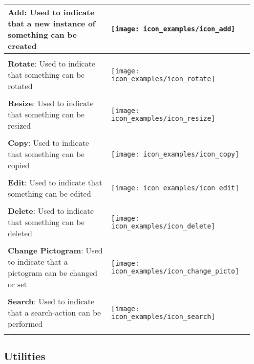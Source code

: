 \begin{longtable}{m{\textwidth-2.2cm} m{1.5cm}}
	\textbf{Add}: Used to indicate that a new instance of something can be created & \parbox[c]{1.2cm}{
	\texttt{[image: icon\_examples/icon\_add]}} \\[0.6cm] \hline \\[-0.6em]

	\textbf{Rotate}: Used to indicate that something can be rotated & \parbox[c]{1.2cm}{
	\texttt{[image: icon\_examples/icon\_rotate]}} \\[0.6cm] \hline \\[-0.6em]

	\textbf{Resize}: Used to indicate that something can be resized & \parbox[c]{1.2cm}{
	\texttt{[image: icon\_examples/icon\_resize]}} \\[0.6cm] \hline \\[-0.6em]

	\textbf{Copy}: Used to indicate that something can be copied & \parbox[c]{1.2cm}{
	\texttt{[image: icon\_examples/icon\_copy]}} \\[0.6cm] \hline \\[-0.6em]

	\textbf{Edit}: Used to indicate that something can be edited & \parbox[c]{1.2cm}{
	\texttt{[image: icon\_examples/icon\_edit]}} \\[0.6cm] \hline \\[-0.6em]

	\textbf{Delete}: Used to indicate that something can be deleted & \parbox[c]{1.2cm}{
	\texttt{[image: icon\_examples/icon\_delete]}} \\[0.6cm] \hline \\[-0.6em]

	\textbf{Change Pictogram}: Used to indicate that a pictogram can be changed or set & \parbox[c]{1.2cm}{
	\texttt{[image: icon\_examples/icon\_change\_picto]}} \\[0.6cm] \hline \\[-0.6em]

	\textbf{Search}: Used to indicate that a search-action can be performed & \parbox[c]{1.2cm}{
	\texttt{[image: icon\_examples/icon\_search]}} \\[0.6cm] \hline \\[-0.6em]
\end{longtable}


\subsection{Utilities}

